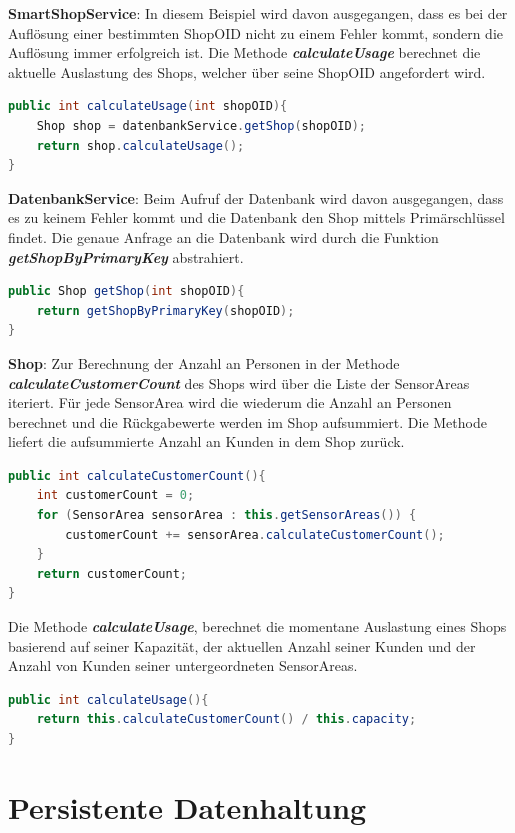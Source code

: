 \documentclass[runningheads]{llncs}
\begin{document}
\textbf{SmartShopService}: In diesem Beispiel wird davon ausgegangen, dass es bei der Auflösung einer bestimmten ShopOID nicht zu einem Fehler kommt, sondern die Auflösung immer erfolgreich ist.
Die Methode \textbf{\textit{calculateUsage}} berechnet die aktuelle Auslastung des Shops, welcher über seine ShopOID angefordert wird.
\begin{lstlisting}[language=Java, basicstyle=\scriptsize]
public int calculateUsage(int shopOID){
	Shop shop = datenbankService.getShop(shopOID);
	return shop.calculateUsage();
}
\end{lstlisting}


\textbf{DatenbankService}: Beim Aufruf der Datenbank wird davon ausgegangen, dass es zu keinem Fehler kommt und die Datenbank den Shop mittels Primärschlüssel findet.
Die genaue Anfrage an die Datenbank wird durch die Funktion \textbf{\textit{getShopByPrimaryKey}} abstrahiert.
\begin{lstlisting}[language=Java, basicstyle=\scriptsize]
public Shop getShop(int shopOID){
	return getShopByPrimaryKey(shopOID);
}
\end{lstlisting}

\break
\textbf{Shop}: Zur Berechnung der Anzahl an Personen in der Methode \textbf{\textit{calculateCustomerCount}} des Shops wird über die Liste der SensorAreas iteriert.
Für jede SensorArea wird die wiederum die Anzahl an Personen berechnet und die Rückgabewerte werden im Shop aufsummiert.
Die Methode liefert die aufsummierte Anzahl an Kunden in dem Shop zurück.
\begin{lstlisting}[language=Java, basicstyle=\scriptsize]
public int calculateCustomerCount(){
	int customerCount = 0;
	for (SensorArea sensorArea : this.getSensorAreas()) {
		customerCount += sensorArea.calculateCustomerCount();
	}
	return customerCount;
}
\end{lstlisting}

Die Methode \textbf{\textit{calculateUsage}}, berechnet die momentane Auslastung eines Shops basierend auf seiner Kapazität, der aktuellen Anzahl seiner Kunden und der Anzahl von Kunden seiner untergeordneten SensorAreas.
\begin{lstlisting}[language=Java, basicstyle=\scriptsize]
public int calculateUsage(){
	return this.calculateCustomerCount() / this.capacity;
}
\end{lstlisting}

\newpage
\section{Persistente Datenhaltung}
\end{document}
